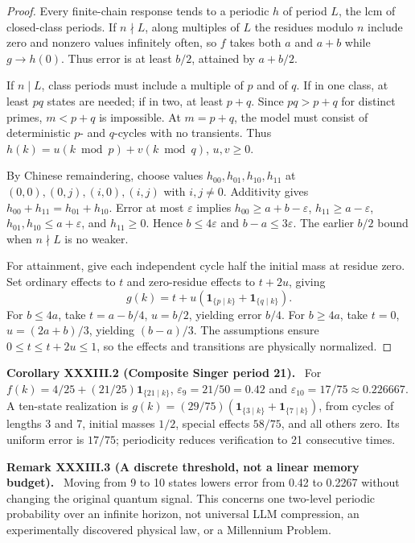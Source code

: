 \documentclass[11pt,a4paper,oneside]{book}
\newcommand{\one}{\mathbf 1}\newcommand{\ii}{\mathrm i}\newcommand{\dd}{\mathrm d}
\newcommand{\statement}[3]{\par\medskip\noindent\textbf{#1 #2 (#3).}\ }
\begin{document}
\begin{proof}Every finite-chain response tends to a periodic $h$ of period $L$, the lcm of closed-class periods. If $n\nmid L$, along multiples of $L$ the residues modulo $n$ include zero and nonzero values infinitely often, so $f$ takes both $a$ and $a+b$ while $g\to h(0)$. Thus error is at least $b/2$, attained by $a+b/2$.

If $n\mid L$, class periods must include a multiple of $p$ and of $q$. If in one class, at least $pq$ states are needed; if in two, at least $p+q$. Since $pq>p+q$ for distinct primes, $m<p+q$ is impossible. At $m=p+q$, the model must consist of deterministic $p$- and $q$-cycles with no transients. Thus $h(k)=u(k\bmod p)+v(k\bmod q)$, $u,v\ge0$.

By Chinese remaindering, choose values $h_{00},h_{01},h_{10},h_{11}$ at $(0,0),(0,j),(i,0),(i,j)$ with $i,j\ne0$. Additivity gives $h_{00}+h_{11}=h_{01}+h_{10}$. Error at most $\varepsilon$ implies $h_{00}\ge a+b-\varepsilon$, $h_{11}\ge a-\varepsilon$, $h_{01},h_{10}\le a+\varepsilon$, and $h_{11}\ge0$. Hence $b\le4\varepsilon$ and $b-a\le3\varepsilon$. The earlier $b/2$ bound when $n\nmid L$ is no weaker.

For attainment, give each independent cycle half the initial mass at residue zero. Set ordinary effects to $t$ and zero-residue effects to $t+2u$, giving
\begin{equation}g(k)=t+u(\one_{\{p\mid k\}}+\one_{\{q\mid k\}}).\tag{121}\end{equation}
For $b\le4a$, take $t=a-b/4$, $u=b/2$, yielding error $b/4$. For $b\ge4a$, take $t=0$, $u=(2a+b)/3$, yielding $(b-a)/3$. The assumptions ensure $0\le t\le t+2u\le1$, so the effects and transitions are physically normalized.\end{proof}
\statement{Corollary}{XXXIII.2}{Composite Singer period 21} For $f(k)=4/25+(21/25)\one_{\{21\mid k\}}$, $\varepsilon_9=21/50=0.42$ and $\varepsilon_{10}=17/75\approx0.226667$. A ten-state realization is $g(k)=(29/75)(\one_{\{3\mid k\}}+\one_{\{7\mid k\}})$, from cycles of lengths 3 and 7, initial masses $1/2$, special effects $58/75$, and all others zero. Its uniform error is $17/75$; periodicity reduces verification to 21 consecutive times.
\statement{Remark}{XXXIII.3}{A discrete threshold, not a linear memory budget} Moving from 9 to 10 states lowers error from 0.42 to 0.2267 without changing the original quantum signal. This concerns one two-level periodic probability over an infinite horizon, not universal LLM compression, an experimentally discovered physical law, or a Millennium Problem.
\end{document}
